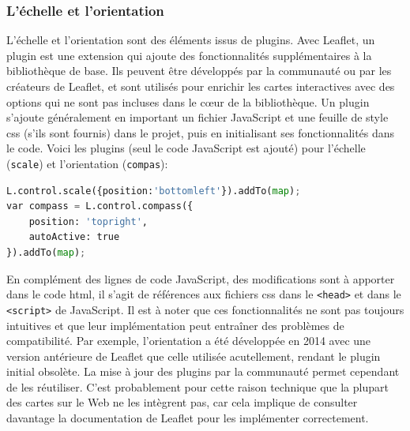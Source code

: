 \subsubsection{L'échelle et l'orientation}
L'échelle et l'orientation sont des éléments issus de plugins. Avec Leaflet, un plugin est une extension qui ajoute des fonctionnalités supplémentaires à la bibliothèque de base. Ils peuvent être développés par la communauté ou par les créateurs de Leaflet, et sont utilisés pour enrichir les cartes interactives avec des options qui ne sont pas incluses dans le cœur de la bibliothèque. Un plugin s’ajoute généralement en important un fichier JavaScript et une feuille de style \acrshort{css} (s'ils sont fournis) dans le projet, puis en initialisant ses fonctionnalités dans le code. 
Voici les plugins (seul le code JavaScript est ajouté) pour l'échelle (\texttt{scale}) et l'orientation (\texttt{compas}):
\begin{lstlisting}[language=PYTHON, caption=Plugins échelle et orientation en JavaScript]
L.control.scale({position:'bottomleft'}).addTo(map);
var compass = L.control.compass({
    position: 'topright',
    autoActive: true  
}).addTo(map); \end{lstlisting}
En complément des lignes de code JavaScript, des modifications sont à apporter dans le code \acrshort{html}, il s'agit de références aux fichiers \acrshort{css} dans le \texttt{<head>} et dans le \texttt{<script>} de JavaScript. Il est à noter que ces fonctionnalités ne sont pas toujours intuitives et que leur implémentation peut entraîner des problèmes de compatibilité. Par exemple, l'orientation a été développée en 2014 avec une version antérieure de Leaflet que celle utilisée acutellement, rendant le plugin initial obsolète. La mise à jour des plugins par la communauté permet cependant de les réutiliser. C'est probablement pour cette raison technique que la plupart des cartes sur le Web ne les intègrent pas, car cela implique de consulter davantage la documentation de Leaflet pour les implémenter correctement.

